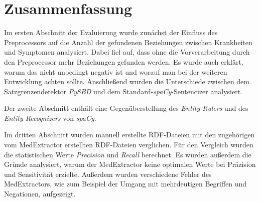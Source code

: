 




\section{Zusammenfassung}
\label{sec:zusammenfassung_evaluierung} 


Im ersten Abschnitt der Evaluierung wurde zunächst der Einfluss des Preprocessors auf die Anzahl der gefundenen Beziehungen zwischen Krankheiten und Symptomen analysiert. Dabei fiel auf, dass ohne die Vorverarbeitung durch den Preprocessor mehr Beziehungen gefunden werden. Es wurde auch erklärt, warum das nicht unbedingt negativ ist und worauf man bei der weiteren Entwicklung achten sollte. Anschließend wurden die Unterschiede zwischen dem Satzgrenzendetektor \emph{PySBD} und dem Standard-\emph{spaCy}-Sentencizer analysiert.

Der zweite Abschnitt enthält eine Gegenüberstellung des \emph{Entity Rulers} und des \emph{Entity Recognizers} von \emph{spaCy}.

Im dritten Abschnitt wurden manuell erstellte RDF-Dateien mit den zugehörigen vom MedExtractor erstellten RDF-Dateien verglichen. Für den Vergleich wurden die statistischen Werte \emph{Precision} und \emph{Recall} berechnet. Es wurden außerdem die Gründe analysiert, warum der MedExtractor keine optimalen Werte bei Präzision und Sensitivität erzielte. Außerdem wurden verschiedene Fehler des MedExtractors, wie zum Beispiel der Umgang mit mehrdeutigen Begriffen und Negationen, aufgezeigt.
